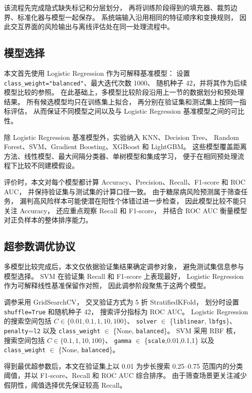 该流程先完成隐式缺失标记和分层划分，
再将训练阶段得到的填充器、裁剪边界、标准化器与模型一起保存。
系统端输入沿用相同的特征顺序和变换规则，
因此交互界面的风险输出与离线评估处在同一处理流程中。

\subsection{模型选择}

本文首先使用 Logistic Regression 作为可解释基准模型：
设置 \texttt{class\_weight="balanced"}、最大迭代次数 1000、
随机种子 42，并将其作为后续模型比较的参照。
在此基础上，多模型比较阶段沿用上一节的数据划分和预处理结果。
所有候选模型均只在训练集上拟合，
再分别在验证集和测试集上按同一指标评估，
从而保证不同模型之间以及与 Logistic Regression 基准模型之间的可比性。

除 Logistic Regression 基准模型外，实验纳入 KNN、Decision Tree、
Random Forest、SVM、Gradient Boosting、XGBoost 和 LightGBM。
这些模型覆盖距离方法、线性模型、最大间隔分类器、单树模型和集成学习，
便于在相同预处理流程下比较不同建模假设。

评价时，本文对每个模型都计算 Accuracy、Precision、Recall、F1-score 和 ROC AUC，
并保持验证集与测试集的计算口径一致。
由于糖尿病风险预测属于筛查任务，
漏判高风险样本可能使潜在阳性个体错过进一步检查，
因此模型比较不能只关注 Accuracy，
还应重点观察 Recall 和 F1-score，
并结合 ROC AUC 衡量模型对正负样本的整体排序能力。

\subsection{超参数调优协议}

多模型比较完成后，本文仅依据验证集结果确定调参对象，
避免测试集信息参与模型选择。
SVM 在验证集 Recall 和 F1-score 上表现最好，
Logistic Regression 作为可解释线性基准保留作对照，
因此调参阶段聚焦于这两个模型。

调参采用 GridSearchCV，
交叉验证方式为 5 折 StratifiedKFold，
划分时设置 \texttt{shuffle=True} 和随机种子 42，
搜索评分指标为 ROC AUC。
Logistic Regression 的搜索空间包括
$C \in \{0.01,0.1,1,10,100\}$、
\texttt{solver} $\in$ \{\texttt{liblinear}, \texttt{lbfgs}\}、
\texttt{penalty}=\texttt{l2}
以及 \texttt{class\_weight} $\in$ \{None, \texttt{balanced}\}。
SVM 采用 RBF 核，
搜索空间包括
$C \in \{0.1,1,10,100\}$、
\texttt{gamma} $\in$ \{\texttt{scale},0.01,0.1,1\}
以及 \texttt{class\_weight} $\in$ \{None, \texttt{balanced}\}。

得到最优超参数后，本文在验证集上以 0.01 为步长搜索 0.25--0.75
范围内的分类阈值，并以 F1-score、Recall 和 ROC AUC 综合排序。
由于筛查场景更关注减少假阴性，阈值选择优先保证较高 Recall。

